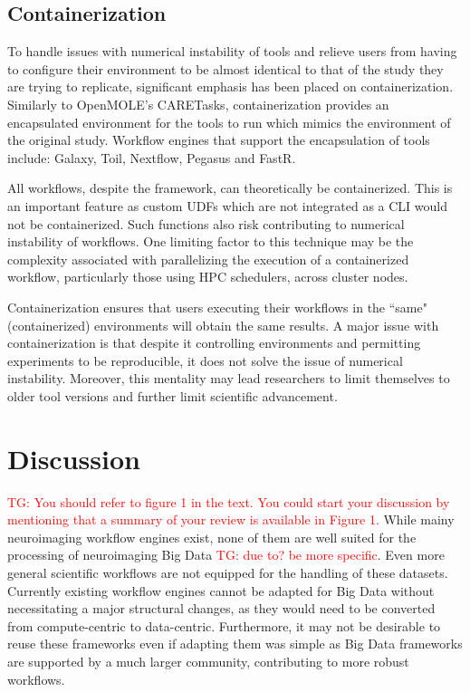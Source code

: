 \documentclass{report}
\newcommand{\tristan}[1]{\textcolor{red}{TG: #1}}
\begin{document}
        \section{Containerization}\label{repcont}

            To handle issues with numerical instability of tools and relieve 
            users from
            having to configure their environment to be almost identical to 
            that of the study they are trying to replicate, significant 
            emphasis has been placed on containerization. Similarly to 
            OpenMOLE's CARETasks, containerization provides an encapsulated
            environment for the tools to run which mimics the environment of 
            the original study. Workflow engines that support the encapsulation of
            tools include: Galaxy, Toil, Nextflow, Pegasus and FastR. 

            All workflows, despite the framework, can theoretically be 
            containerized. This is an important feature as custom UDFs which 
            are not integrated as a CLI would not be containerized. Such 
            functions also risk contributing to numerical instability of 
            workflows. One limiting factor to this technique may be the complexity
            associated with parallelizing the execution of a containerized 
            workflow, particularly those using HPC schedulers, across cluster 
            nodes.  

            Containerization ensures that users executing their 
            workflows in the ``same" (containerized) environments will obtain the same results.
            A major issue with containerization is that despite it controlling
            environments and permitting experiments to be reproducible, it does
            not solve the issue of numerical instability. Moreover, this 
            mentality may lead researchers to limit themselves to older tool 
            versions and further limit scientific advancement.
    
    
    \chapter{Discussion}
    \tristan{You should refer to figure 1 in the text. You could start your discussion by mentioning that
    a summary of your review is available in Figure 1.}
        While mainy neuroimaging workflow engines exist, none of them are well
        suited for the processing of neuroimaging Big Data \tristan{due to? be more specific}. Even more general
        scientific workflows are not equipped for the handling of these datasets.
        Currently existing workflow engines cannot be adapted for Big Data without
        necessitating a major structural changes, as they would need to be converted
        from compute-centric to data-centric. Furthermore, it may not be desirable
        to reuse these frameworks even if adapting them was simple as Big Data 
        frameworks are supported by a much larger community, contributing to 
        more robust workflows.
\end{document}
